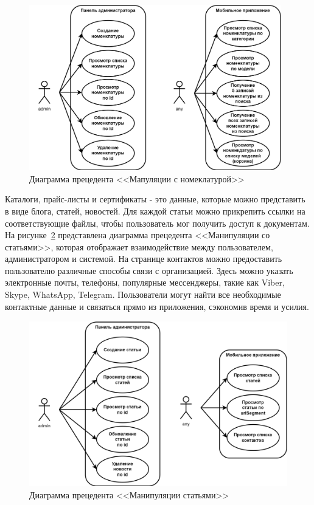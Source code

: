 \begin{figure}[!htb]
    \centering

    \includegraphics[height=7.2cm]
    {images/UML/use_case/items/items.png}

    \caption{Диаграмма прецедента <<Мапуляции с номеклатурой>>}

    \label{fig:UML_use_case_items}
\end{figure}

Каталоги, прайс-листы и сертификаты - это данные, которые можно представить в виде блога, статей, новостей.
Для каждой статьи можно прикрепить ссылки на соответствующие файлы,
чтобы пользователь мог получить доступ к документам.
На рисунке~\ref{fig:UML_use_case_articles} представлена диаграмма прецедента <<Манипуляции со статьями>>,
которая отображает взаимодействие между пользователем, администратором и системой.
На странице контактов можно предоставить пользователю различные способы связи с организацией.
Здесь можно указать электронные почты, телефоны, популярные мессенджеры, такие как Viber, Skype, WhatsApp, Telegram.
Пользователи могут найти все необходимые контактные данные и связаться прямо из приложения, сэкономив время и усилия.

\begin{figure}[!htb]
    \centering

    \includegraphics[height=7.2cm]
    {images/UML/use_case/articles/articles.png}

    \caption{Диаграмма прецедента <<Манипуляции статьями>>}

    \label{fig:UML_use_case_articles}
\end{figure}

